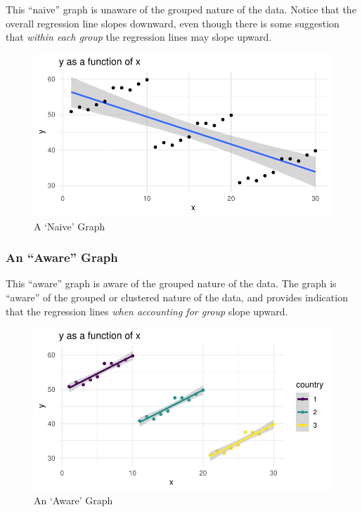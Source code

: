 \documentclass[
  letterpaper,
  DIV=11,
  numbers=noendperiod]{scrreprt}
\begin{document}
This ``naive'' graph is unaware of the grouped nature of the data.
Notice that the overall regression line slopes downward, even though
there is some suggestion that \emph{within each group} the regression
lines may slope upward.

\begin{figure}

{\centering \includegraphics{./cross-sectional_files/figure-pdf/fig-naive-1.pdf}

}

\caption{\label{fig-naive}A `Naive' Graph}

\end{figure}

\hypertarget{an-aware-graph}{%
\subsubsection{An ``Aware'' Graph}\label{an-aware-graph}}

This ``aware'' graph is aware of the grouped nature of the data. The
graph is ``aware'' of the grouped or clustered nature of the data, and
provides indication that the regression lines \emph{when accounting for
group} slope upward.

\begin{figure}

{\centering \includegraphics{./cross-sectional_files/figure-pdf/fig-aware-1.pdf}

}

\caption{\label{fig-aware}An `Aware' Graph}

\end{figure}
\end{document}
